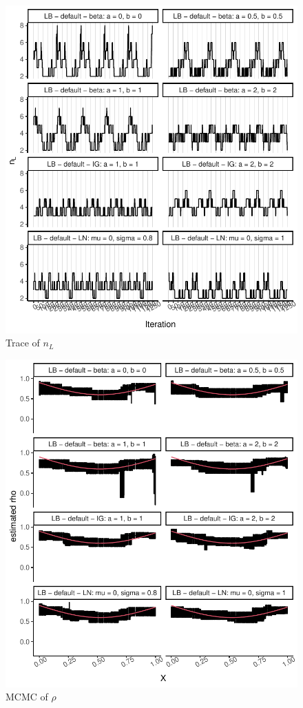 \documentclass{amsart}
\begin{document}
\begin{figure}[ht]
	\centering
	\includegraphics[width=0.95\linewidth]{trace_nl_4.pdf}
	\caption{Trace of $n_L$}
	\label{fig:trace:nl:4}
\end{figure}

\begin{figure}[ht]
	\centering
	\includegraphics[width=0.95\linewidth]{mcmc_rho_4.pdf}
	\caption{MCMC of $\rho$}
	\label{fig:mcmc:rho:4}
\end{figure}
\end{document}
